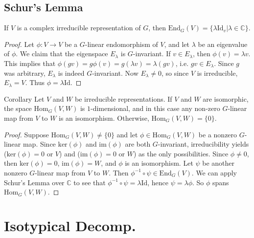 \subsection{Schur's Lemma}
\begin{frame}
\begin{theorem} If $V$ is a complex irreducible representation of $G$, then $\text{End}_G(V) = \{ \lambda \text{Id}_v \vert \lambda \in \mathbb{C} \}$.
\end{theorem}
\begin{proof}
Let $\phi \colon V \to V$  be a $G$-linear endomorphism of $V$, and let $\lambda$ be an eigenvalue of $\phi$.  We claim that the eigenspace $E_\lambda$ is $G$-invariant. If $v \in E_\lambda$, then $\phi(v) = \lambda v$.  This implies that $\phi(g v) = g \phi(v) = g (\lambda v) = \lambda (gv)$, i.e. $gv \in E_\lambda$. Since $g$ was arbitrary, $E_\lambda$ is indeed $G$-invariant.  Now $E_\lambda \neq 0$, so since $V$ is irreducible, $E_\lambda = V$.  Thus $\phi = \lambda \text{Id}$.  
\end{proof}
\end{frame}

\begin{frame}
\begin{block}{Corollary}
Let $V$ and $W$ be irreducible representations. If $V$ and $W$ are isomorphic, the space $\text{Hom}_G(V,W)$ is $1$-dimensional, and in this case any non-zero $G$-linear map from $V$ to $W$ is an isomorphism. Otherwise,  $\text{Hom}_G(V,W)=\{0\}$.
\end{block}
\begin{proof}
Suppose  $\text{Hom}_G(V,W) \neq \{0\}$ and let $\phi \in \text{Hom}_G(V,W)$ be a nonzero $G$-linear map. Since $\text{ker}(\phi)$ and $\text{im}(\phi)$ are both $G$-invariant, irreducibility yields ($\text{ker}(\phi) = 0$ or $V$) and ($\text{im}(\phi) = 0$ or $W$) as the only possibilities.  Since $\phi \neq 0$, then $\text{ker}(\phi)=0$, $\text{im}(\phi)=W$, and $\phi$ is an isomorphism.  
Let $\psi$ be another nonzero $G$-linear map from $V$ to $W$.  Then $\phi ^{-1} \circ \psi \in \text{End}_G (V)$.  We can apply Schur's Lemma over $\mathbb{C}$ to see that $\phi ^{-1} \circ \psi = \lambda \text{Id}$, hence $\psi = \lambda \phi$.  So $\phi$ spans $\text{Hom}_G(V,W)$.
\end{proof}
\end{frame}

\section{Isotypical Decomp.}
